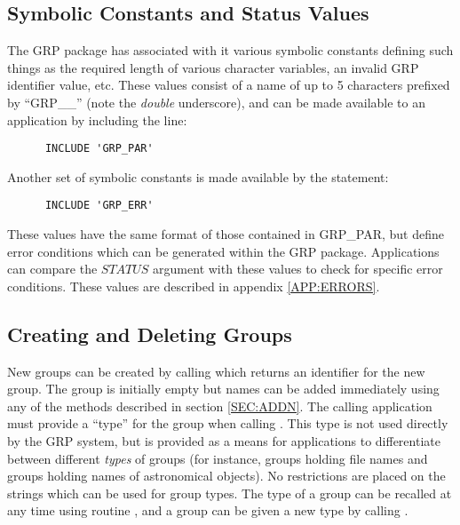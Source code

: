 \subsection{Symbolic Constants and Status Values}
The GRP package has associated with it various symbolic constants defining such
things as the required length of various character variables, an invalid GRP
identifier value, etc. These values consist of a name of up to 5 characters
prefixed by ``GRP\_\_''  (note the {\em double} underscore), and can be made
available to an application by including the line:

\small
\begin{verbatim}
      INCLUDE 'GRP_PAR'
\end{verbatim}
\normalsize

Another set of symbolic constants is made available by the
statement:

\small
\begin{verbatim}
      INCLUDE 'GRP_ERR'
\end{verbatim}
\normalsize

These values have the same format of those contained in GRP\_PAR, but define
error conditions which can be generated within the GRP package. Applications can
compare the $STATUS$ argument with these values to check for specific error
conditions. These values are described in appendix \ref {APP:ERRORS}.

\subsection{Creating and Deleting Groups}
New groups can be created by calling  which returns an identifier for
the new group. The group is initially empty but names can be added immediately
using any of the methods described in section \ref{SEC:ADDN}. The calling
application must provide a ``type'' for the group when calling . This
type is not used directly by the GRP system, but is provided as a means for
applications to differentiate between different {\em types} of groups (for
instance, groups holding file names and groups holding names of astronomical
objects). No restrictions are placed on the strings which can be used for
group types. The type of a group can be recalled at any time using routine
, and a group can be given a new type by calling .

